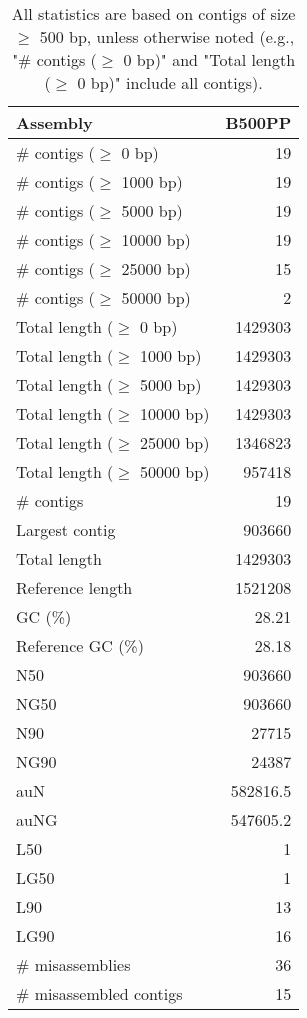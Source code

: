 \documentclass[12pt,a4paper]{article}
\begin{document}
\begin{table}[ht]
\begin{center}
\caption{All statistics are based on contigs of size $\geq$ 500 bp, unless otherwise noted (e.g., "\# contigs ($\geq$ 0 bp)" and "Total length ($\geq$ 0 bp)" include all contigs).}
\begin{tabular}{|l*{1}{|r}|}
\hline
Assembly & B500PP \\ \hline
\# contigs ($\geq$ 0 bp) & 19 \\ \hline
\# contigs ($\geq$ 1000 bp) & 19 \\ \hline
\# contigs ($\geq$ 5000 bp) & 19 \\ \hline
\# contigs ($\geq$ 10000 bp) & 19 \\ \hline
\# contigs ($\geq$ 25000 bp) & 15 \\ \hline
\# contigs ($\geq$ 50000 bp) & 2 \\ \hline
Total length ($\geq$ 0 bp) & 1429303 \\ \hline
Total length ($\geq$ 1000 bp) & 1429303 \\ \hline
Total length ($\geq$ 5000 bp) & 1429303 \\ \hline
Total length ($\geq$ 10000 bp) & 1429303 \\ \hline
Total length ($\geq$ 25000 bp) & 1346823 \\ \hline
Total length ($\geq$ 50000 bp) & 957418 \\ \hline
\# contigs & 19 \\ \hline
Largest contig & 903660 \\ \hline
Total length & 1429303 \\ \hline
Reference length & 1521208 \\ \hline
GC (\%) & 28.21 \\ \hline
Reference GC (\%) & 28.18 \\ \hline
N50 & 903660 \\ \hline
NG50 & 903660 \\ \hline
N90 & 27715 \\ \hline
NG90 & 24387 \\ \hline
auN & 582816.5 \\ \hline
auNG & 547605.2 \\ \hline
L50 & 1 \\ \hline
LG50 & 1 \\ \hline
L90 & 13 \\ \hline
LG90 & 16 \\ \hline
\# misassemblies & 36 \\ \hline
\# misassembled contigs & 15 \\ \hline

\end{tabular}
\end{center}
\end{table}
\end{document}
